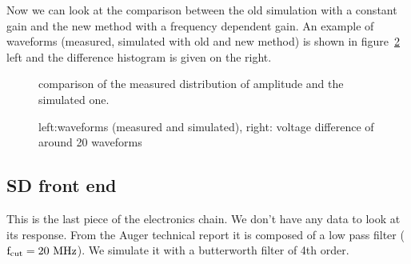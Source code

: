 Now we  can look at the  comparison between the old  simulation with a
constant gain and  the new method with a  frequency dependent gain. An
example of waveforms (measured, simulated  with old and new method) is
shown in  figure~\ref{fig:simboard} left and  the difference histogram
is given on the right.
\begin{figure}[!ht]
  \centering
  \hspace*{-3ex}
  \caption{comparison of the measured distribution of amplitude and the simulated one.}
  \label{fig:datatrace}
\end{figure}


\begin{figure}[!ht]
  \centering
  \hspace*{-3ex}
  \caption{left:waveforms  (measured  and  simulated), right:  voltage
    difference of around 20 waveforms}
  \label{fig:simboard}
\end{figure}

\newpage
\subsection{SD front end}
This is  the last piece  of the electronics  chain. We don't  have any
data to look  at its response.  From the Auger  technical report it is
composed of a  low pass filter ($\rm f_{cut}  = 20~MHz$).  We simulate
it with a butterworth filter of 4th order.


